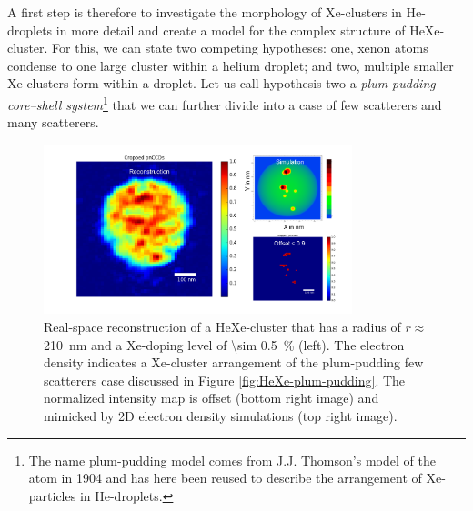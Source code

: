 %
A first step is therefore to investigate the morphology of Xe-clusters in He-droplets in more detail and create a model for the complex structure of HeXe-cluster. For this, we can state two competing hypotheses: one, xenon atoms condense to one large cluster within a helium droplet; and two, multiple smaller Xe-clusters form within a droplet. Let us call hypothesis two a \textit{plum-pudding core--shell system}\footnote{The name plum-pudding model comes from J.J. Thomson's model of the atom in 1904 and has here been reused to describe the arrangement of Xe-particles in He-droplets.} that we can further divide into a case of few scatterers and many scatterers.\\[1\baselineskip]
%
\begin{figure}
 	\centering
 		\includegraphics[width=0.80\textwidth]{images/results/reconstructions-to-simulations.png}
 	\caption[Reconstruction of HeXe-clusters and simulated electron densities.]{Real-space reconstruction of a HeXe-cluster that has a radius of $r\approx$ \SI{210}{\nano\meter} and a Xe-doping level of \SI{\sim 0.5}{\percent} (left). The electron density indicates a Xe-cluster arrangement of the plum-pudding few scatterers case discussed in Figure \ref{fig:HeXe-plum-pudding}. The normalized intensity map is offset (bottom right image) and mimicked by 2D electron density simulations (top right image).}
 	\label{fig:HeXe-cluster-60}
\end{figure}
